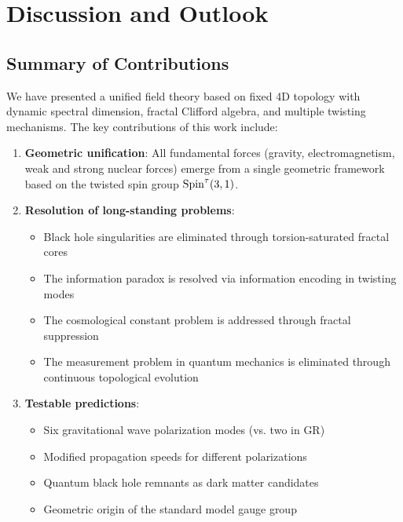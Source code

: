 \section{Discussion and Outlook}
\label{sec:outlook}

\subsection{Summary of Contributions}

We have presented a unified field theory based on fixed 4D topology with dynamic spectral dimension, fractal Clifford algebra, and multiple twisting mechanisms. The key contributions of this work include:

\begin{enumerate}
    \item \textbf{Geometric unification}: All fundamental forces (gravity, electromagnetism, weak and strong nuclear forces) emerge from a single geometric framework based on the twisted spin group $\mathrm{Spin}^\tau(3,1)$.
    
    \item \textbf{Resolution of long-standing problems}:
    \begin{itemize}
        \item Black hole singularities are eliminated through torsion-saturated fractal cores
        \item The information paradox is resolved via information encoding in twisting modes
        \item The cosmological constant problem is addressed through fractal suppression
        \item The measurement problem in quantum mechanics is eliminated through continuous topological evolution
    \end{itemize}
    
    \item \textbf{Testable predictions}:
    \begin{itemize}
        \item Six gravitational wave polarization modes (vs. two in GR)
        \item Modified propagation speeds for different polarizations
        \item Quantum black hole remnants as dark matter candidates
        \item Geometric origin of the standard model gauge group
    \end{itemize}
\end{enumerate}

